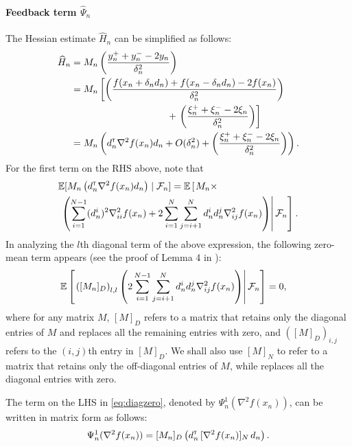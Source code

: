 \documentclass[twocolumn]{IEEEtran}
\begin{document}
\paragraph{\textbf{Feedback term }$\widehat \Psi_n$}
The Hessian estimate $\widehat H_n$ can be simplified as follows: 
\begin{align}
\widehat H_n & = M_n \left(\dfrac{y_n^+ + y_n^- - 2 y_n}{\delta_n^2}\right) \nonumber \\
& =  M_n \left[\left(\dfrac{f(x_n+\delta_n d_n) + f(x_n-\delta_n d_n) - 2 f(x_n)}{\delta_n^2}\right) \right.\nonumber \\&\hspace{10em}+\left. \left(\dfrac{\xi_n^+ + \xi_n^- - 2 \xi_n}{\delta_n^2}\right)\right] \nonumber \\
& = M_n \left(d_n\tr \nabla^2 f(x_n) d_n +  O(\delta_n^2) + \left(\dfrac{\xi_n^+ + \xi_n^- - 2 \xi_n}{\delta_n^2} \right)\right).\label{eq:h0}
\end{align}
For the first term on the RHS above, note that 
\begin{align}
&\E[M_n \left(d_n\tr \nabla^2 f(x_n) d_n\right) \mid \F_n] =   \E\left[\left. M_n \times\right.\right.\nonumber\\
&\left.\left.\left(\sum\limits_{i=1}^{N-1} (d_n^i)^2 \nabla^2_{ii} f(x_n) + 2\sum\limits_{i=1}^N\sum\limits_{j=i+1}^N d_n^i d_n^j \nabla^2_{ij} f(x_n) \right)\right| \F_n\right]. \label{eq:h1}
\end{align}
In analyzing the $l$th diagonal term of the above expression, the following zero-mean term appears (see the proof of Lemma 4 in \cite{prashanth2015rdsa}):
\begin{align}
& \E\left[\left. \left([M_n]_{D}\right)_{l,l} \left(2\sum\limits_{i=1}^{N-1}\sum\limits_{j=i+1}^N d_n^i d_n^j \nabla^2_{ij} f(x_n)\right)\right| \F_{n}\right] = 0,\label{eq:diagzero}
\end{align}
where for any matrix $M$, $[M]_{D}$ refers to a matrix that retains only the diagonal entries of $M$ and replaces all the remaining  entries with zero, and $\left([M]_{D}\right)_{i,j}$ refers to the $(i,j)$th entry in $[M]_D$. We shall also use $[M]_{N}$ to refer to a matrix that retains only the off-diagonal entries of $M$, while replaces all the diagonal entries with zero.

The term on the LHS in \eqref{eq:diagzero}, denoted by $\Psi_{n}^{1}(\nabla^2 f(x_n))$, can be written in matrix form as follows: 
\begin{align}\label{eq:digmat}
\Psi_{n}^{1}(\nabla^2 f(x_n)) = [M_n]_{D}\left(d_{n}\tr \, [\nabla^2 f(x_n)]_{N} \, d_{n}\right).
\end{align}
\end{document}
